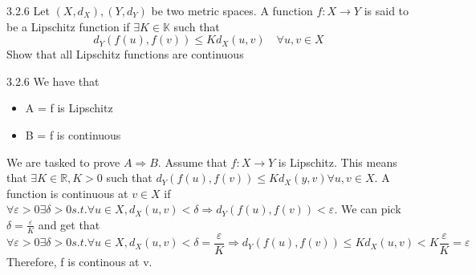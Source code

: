 \documentclass[a4paper,norsk]{article}
\renewcommand{\leq}{\leqslant}
\renewcommand{\epsilon}{\varepsilon}
\begin{document}
\begin{oppgavebox}{3.2.6}{}
Let $ \left( X, d_X \right) , \left( Y, d_Y \right)  $ be two metric spaces. A function $ f: X \rightarrow Y $ is said to be a Lipschitz function if $ \exists K \in \mathbb{K}  $ such that 
\[
    d_Y (f(u), f(v)) \leq K d_X (u, v) \quad \forall u, v \in X
\]
Show that all Lipschitz functions are continuous
\begin{proofbox}{3.2.6}{}
  We have that 
  \begin{itemize}
    \item A = f is Lipschitz
    \item B = f is continuous
  \end{itemize}
  We are tasked to prove $ A \Rightarrow B $. Assume that $ f: X \rightarrow Y $ is Lipschitz. This means that $ \exists K \in \mathbb{R}, K > 0 $ such that $ d_Y (f(u), f(v)) \leq K d_X( y, v) \forall u, v \in X $. A function is continuous at $ v \in X $  if $ \forall \epsilon > 0 \exists \delta > 0 s.t. \forall u \in X, d_X(u, v) < \delta \Rightarrow d_Y (f(u), f(v)) < \epsilon   $. We can pick $ \delta = \frac{ \epsilon }{ K } $ and get that 
  \[
      \forall \epsilon > 0 \exists \delta > 0 s.t. \forall u \in X, d_X (u, v) < \delta = \frac{ \epsilon  }{ K } \Rightarrow d_Y (f(u), f(v)) \leq K d_X(u, v) < K \frac{ \epsilon }{ K } = \epsilon 
  \]
  Therefore, f is continous at v.
\end{proofbox}

\end{oppgavebox}
\end{document}
